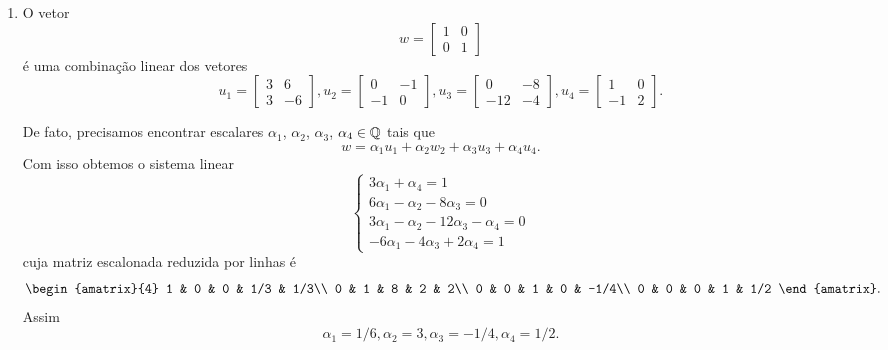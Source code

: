 \begin{exemplo}
\begin{enumerate}[label={\arabic*})]
		    \item O vetor
		    	\[
		    		w = \begin{bmatrix}
		    			1 & 0\\
		    			0 & 1
		    		\end{bmatrix}
		    	\]
		    	é uma combinação linear dos vetores
		    	\[
		    		u_1 = \begin{bmatrix}3 & 6\\3 & -6\end{bmatrix},
		    		u_2 = \begin{bmatrix}0 & -1\\-1 & 0\end{bmatrix},
		    		u_3 = \begin{bmatrix}0 & -8\\-12 & -4\end{bmatrix},
		    		u_4 = \begin{bmatrix}1 & 0\\-1 & 2\end{bmatrix}.
		    	\]
		    	\begin{solucao}
		    		De fato, precisamos encontrar escalares $\alpha_1$, $\alpha_2$, $\alpha_3$, $\alpha_4 \in \mathbb{Q}$ tais que
		    		\[ w = \alpha_1 u_1 + \alpha_2 w_2 + \alpha_3 u_3 + \alpha_4 u_4.\]
		    		Com isso obtemos o sistema linear
		    		\[
		    			\begin{cases}
		    				3\alpha_1 + \alpha_4 = 1\\
		    				6\alpha_1 - \alpha_2 - 8\alpha_3 = 0\\
		    				3\alpha_1 - \alpha_2 - 12 \alpha_3 - \alpha_4 = 0\\
		    				-6\alpha_1 - 4\alpha_3 + 2\alpha_4 = 1
		    			\end{cases}
		    		\]
		    		cuja matriz escalonada reduzida por linhas é
		    		\[
		    			\begin{amatrix}{4}
		    				1 & 0 & 0 & 1/3 & 1/3\\
		    				0 & 1 & 8 & 2 & 2\\
		    				0 & 0 & 1 & 0 & -1/4\\
		    				0 & 0 & 0 & 1 & 1/2
		    			\end{amatrix}.
		    		\]
		    		Assim
		    		\[\alpha_1 = 1/6, \alpha_2 = 3, \alpha_3 = -1/4, \alpha_4 = 1/2.\]
		    	\end{solucao}
	\end{enumerate}
\end{exemplo}

